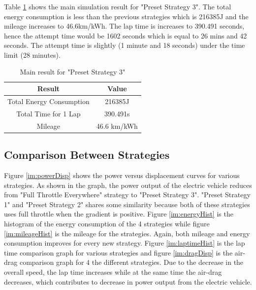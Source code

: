 Table \ref{tb:preset3Result} shows the main simulation result for "Preset Strategy 3". The total energy consumption is less than the previous strategies which is 216385J and the mileage increases to 46.6km/kWh. The lap time is increases to 390.491 seconds, hence the attempt time would be 1602 seconds which is equal to 26 mins and 42 seconds. The attempt time is slightly (1 minute and 18 seconds) under the time limit (28 minutes).

\begin{table}[htbp]
\begin{center}
\begin{tabular}{|c|c|}
\hline
\textbf{Result} & \textbf{Value} \\ \hline
Total Energy Consumption & 216385J \\ \hline
Total Time for 1 Lap & 390.491s \\ \hline
Mileage & 46.6 km/kWh \\ \hline
\end{tabular}
\end{center}
\caption{Main result for "Preset Strategy 3" }
\label{tb:preset3Result}
\end{table} \clearpage

\subsection{Comparison Between Strategies}

Figure \ref{im:powerDisp} shows the power versus displacement curves for various strategies. As shown in the graph, the power output of the electric vehicle reduces from "Full Throttle Everywhere" strategy to "Preset Strategy 3". "Preset Strategy 1" and "Preset Strategy 2" shares some similarity because both of these strategies uses full throttle when the gradient is positive. Figure \ref{im:energyHist} is the histogram of the energy consumption of the 4 strategies while figure \ref{im:mileageHist} is the mileage for the strategies. Again, both mileage and energy consumption improves for every new strategy. Figure \ref{im:laptimeHist} is the lap time comparison graph for various strategies and figure \ref{im:dragDisp} is the air-drag comparison graph for 4 the different strategies. Due to the decrease in the overall speed, the lap time increases while at the same time the air-drag decreases, which contributes to decrease in power output from the electric vehicle. 

